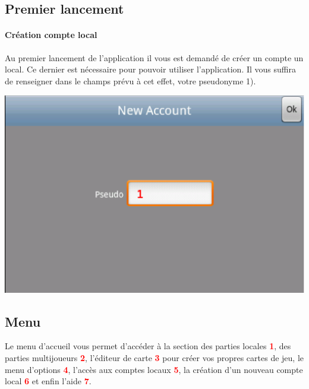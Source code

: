 

\subsection{Premier lancement}
	
		
	\paragraph{Création compte local\\}
	Au premier lancement de l'application il vous est demandé de créer un compte un
	local. Ce dernier est nécessaire pour pouvoir utiliser l'application. Il vous
	suffira de renseigner dans le champs prévu à cet effet, votre pseudonyme 1).
	\begin{center}
			\includegraphics[scale=0.6]{Manuel/Img/2.eps}
	\end{center}

	
\subsection{Menu}	
	Le menu d'accueil vous permet d'accéder à la section des parties locales
	\textcolor{red}{\textbf{1}}, des parties multijoueurs
	\textcolor{red}{\textbf{2}}, l'éditeur de carte \textcolor{red}{\textbf{3}}
	pour créer vos propres cartes de jeu, le menu d'options
	\textcolor{red}{\textbf{4}}, l'accès aux comptes locaux
	\textcolor{red}{\textbf{5}}, la création d'un nouveau compte local
	\textcolor{red}{\textbf{6}} et enfin l'aide \textcolor{red}{\textbf{7}}.
	
